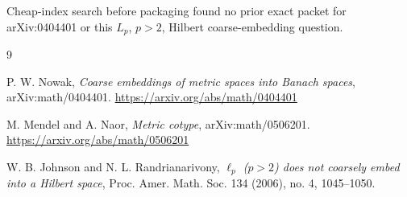 \documentclass[11pt]{article}
\begin{document}
Cheap-index search before packaging found no prior exact packet for
arXiv:0404401 or this \(L_p\), \(p>2\), Hilbert coarse-embedding question.

\begin{thebibliography}{9}

P. W. Nowak,
\emph{Coarse embeddings of metric spaces into Banach spaces},
arXiv:math/0404401.
\url{https://arxiv.org/abs/math/0404401}

M. Mendel and A. Naor,
\emph{Metric cotype},
arXiv:math/0506201.
\url{https://arxiv.org/abs/math/0506201}

W. B. Johnson and N. L. Randrianarivony,
\emph{\(\ell_p\) (\(p>2\)) does not coarsely embed into a Hilbert space},
Proc. Amer. Math. Soc. 134 (2006), no. 4, 1045--1050.

\end{thebibliography}
\end{document}
